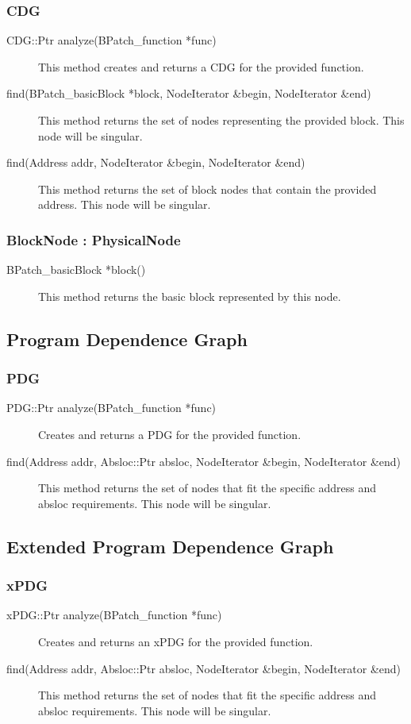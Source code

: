 \documentclass[12pt,titlepage]{article}
\begin{document}
\subsubsection{CDG}
\begin{description}
\item[CDG::Ptr analyze(BPatch\_function *func)]
This method creates and returns a CDG for the provided function.
\item[find(BPatch\_basicBlock *block, NodeIterator \&begin, NodeIterator \&end)]
This method returns the set of nodes representing the provided block. This node
will be singular.
\item[find(Address addr, NodeIterator \&begin, NodeIterator \&end)]
This method returns the set of block nodes that contain the provided address. This node
will be singular.
\end{description}

\subsubsection{BlockNode : PhysicalNode}
\begin{description}
\item[BPatch\_basicBlock *block() ]
This method returns the basic block represented by this node. 
\end{description}

\subsection{Program Dependence Graph}
\subsubsection{PDG}
\begin{description}
\item[PDG::Ptr analyze(BPatch\_function *func)]
Creates and returns a PDG for the provided function.
\item[find(Address addr, Absloc::Ptr absloc, NodeIterator \&begin, NodeIterator \&end) ]
This method returns the set of nodes that fit the specific address and absloc requirements. This node will be singular.
\end{description}

\subsection{Extended Program Dependence Graph}
\subsubsection{xPDG}
\begin{description}
\item[xPDG::Ptr analyze(BPatch\_function *func)]
Creates and returns an xPDG for the provided function.
\item[find(Address addr, Absloc::Ptr absloc, NodeIterator \&begin, NodeIterator \&end) ]
This method returns the set of nodes that fit the specific address and absloc requirements. This node will be singular.
\end{description}
\end{document}
